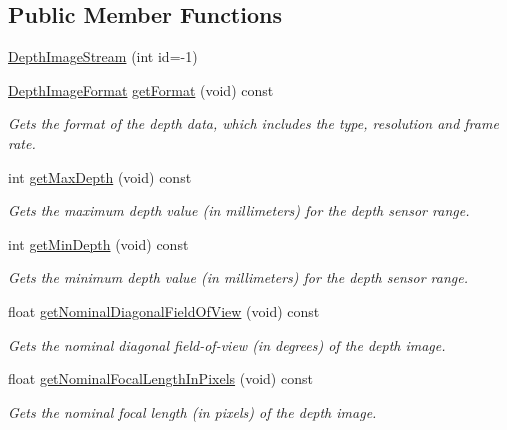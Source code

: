 \subsection*{\-Public \-Member \-Functions}
\begin{DoxyCompactItemize}
\item 
\hyperlink{class_depth_image_stream_a04ae566becca56527c515856c74c05bc}{\-Depth\-Image\-Stream} (int id=-\/1)
\item 
\hyperlink{depth_image_format_8h_a00bd0eac7784357ebca4c1e6a50b51af}{\-Depth\-Image\-Format} \hyperlink{class_depth_image_stream_a82f63d7a6d61abdc40db23cb75d49c39}{get\-Format} (void) const 
\begin{DoxyCompactList}\small\item\em \-Gets the format of the depth data, which includes the type, resolution and frame rate. \end{DoxyCompactList}\item 
int \hyperlink{class_depth_image_stream_a591b2e42378d4d3cfcb7e2a9ab19b1c8}{get\-Max\-Depth} (void) const 
\begin{DoxyCompactList}\small\item\em \-Gets the maximum depth value (in millimeters) for the depth sensor range. \end{DoxyCompactList}\item 
int \hyperlink{class_depth_image_stream_af0554c3800d5dc23899af74849411660}{get\-Min\-Depth} (void) const 
\begin{DoxyCompactList}\small\item\em \-Gets the minimum depth value (in millimeters) for the depth sensor range. \end{DoxyCompactList}\item 
float \hyperlink{class_depth_image_stream_a44f10f96cec4e10b78d0d4a7941ef423}{get\-Nominal\-Diagonal\-Field\-Of\-View} (void) const 
\begin{DoxyCompactList}\small\item\em \-Gets the nominal diagonal field-\/of-\/view (in degrees) of the depth image. \end{DoxyCompactList}\item 
float \hyperlink{class_depth_image_stream_a6aab7cdaddd062664996450e821c7654}{get\-Nominal\-Focal\-Length\-In\-Pixels} (void) const 
\begin{DoxyCompactList}\small\item\em \-Gets the nominal focal length (in pixels) of the depth image. \end{DoxyCompactList}\item 

\end{DoxyCompactItemize}
